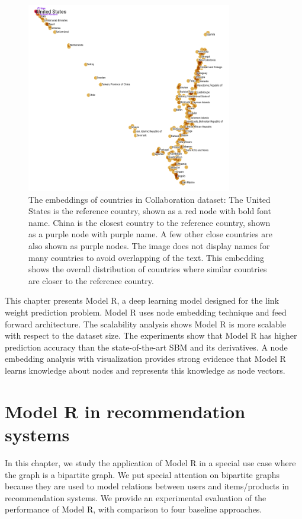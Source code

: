 \documentclass[12pt]{WSUThesis}
\theoremstyle{definition}
\begin{document}
\begin{figure}[!ht]\centering
	\includegraphics[width=0.8\textwidth]{countries-annotation-1}
	\caption{
		The embeddings of countries in Collaboration dataset:
		The United States is the reference country, shown as a red node with bold font name.
		China is the closest country to the reference country, shown as a purple node with purple name.
		A few other close countries are also shown as purple nodes.
		The image does not display names for many countries to avoid overlapping of the text.
		This embedding shows the overall distribution of countries where similar countries are closer to the reference country.
	}
	\label{fig:countries}
\end{figure}

This chapter presents Model R, a deep learning model designed for the link weight prediction problem. Model R uses node embedding technique and feed forward architecture.
The scalability analysis shows Model R is more scalable with respect to the dataset size.
The experiments show that Model R has higher prediction accuracy than the state-of-the-art SBM and its derivatives.
A node embedding analysis with visualization provides strong evidence that Model R learns knowledge about nodes and represents this knowledge as node vectors.

\chapter{Model R in recommendation systems}
In this chapter, we study the application of Model R in
a special use case where the graph is a bipartite graph.
We put special attention on bipartite graphs because they are used to model relations between users and items/products in recommendation systems.
We provide an experimental evaluation of the performance of Model R, with comparison to four baseline approaches.
\end{document}
